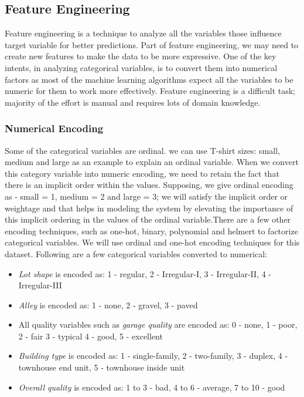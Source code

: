 \documentclass[sigconf]{acmart}
\begin{document}
	\subsection{Feature Engineering}
	
	Feature engineering is a technique to analyze all the variables those influence target variable for better predictions. Part of feature engineering, we may need to create new features to make the data to be more expressive. One of the key intents, in analyzing categorical variables, is to convert them into numerical factors as most of the machine learning algorithms expect all the variables to be numeric for them to work more effectively. Feature engineering is a difficult task; majority of the effort is manual and requires lots of domain knowledge.
	
	\subsubsection{Numerical Encoding}
	 Some of the categorical variables are ordinal. we can use T-shirt sizes: small, medium and large as an example to explain an ordinal variable. When we convert this category variable into numeric encoding, we need to retain the fact that there is an implicit order within the values. Supposing, we give ordinal encoding as - small = 1, medium = 2 and large = 3; we will satisfy the implicit order or weightage and that helps in modeling the system by elevating the importance of this implicit ordering in the values of the ordinal variable.There are a few other encoding techniques, such as one-hot, binary, polynomial and helmert to factorize categorical variables. We will use ordinal and one-hot encoding techniques for this dataset. Following are a few categorical variables converted to numerical:
	
	\begin{itemize}
		\item {\em Lot shape} is encoded as: 1 - regular, 2 - Irregular-I, 3 - Irregular-II, 4 - Irregular-III
		 \item {\em Alley} is encoded as: 1 - none, 2 - gravel, 3 - paved
		 \item All quality variables such as {\em garage quality} are encoded as: 0 - none, 1 - poor, 2 - fair 3 - typical 4 - good, 5 - excellent
		 \item {\em Building type} is encoded as: 1 - single-family, 2 - two-family, 3 - duplex, 4 - townhouse end unit, 5 - townhouse inside unit
		 \item {\em Overall quality} is encoded as: 1 to 3 - bad, 4 to 6 - average, 7 to 10 - good		 
		 
	\end{itemize}
\end{document}
